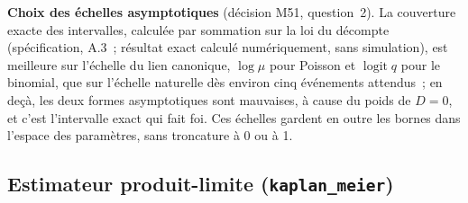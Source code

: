 \documentclass[a4paper,11pt]{article}
\newcommand{\code}[1]{\texttt{\small #1}}
\begin{document}
\noindent
\textbf{Choix des échelles asymptotiques} (décision M51, question~2). La
couverture exacte des intervalles, calculée par sommation sur la loi du
décompte (spécification, A.3~; résultat exact calculé numériquement, sans
simulation), est meilleure sur l'échelle du lien canonique, $\log\mu$ pour
Poisson et $\operatorname{logit} q$ pour le binomial, que sur l'échelle
naturelle dès environ cinq événements attendus~; en deçà, les deux formes
asymptotiques sont mauvaises, à cause du poids de $D = 0$, et c'est
l'intervalle exact qui fait foi. Ces échelles gardent en outre les bornes
dans l'espace des paramètres, sans troncature à 0 ou à 1.

\subsection{Estimateur produit-limite (\code{kaplan\_meier})}
\label{sec:brut-kaplan-meier}
\end{document}
